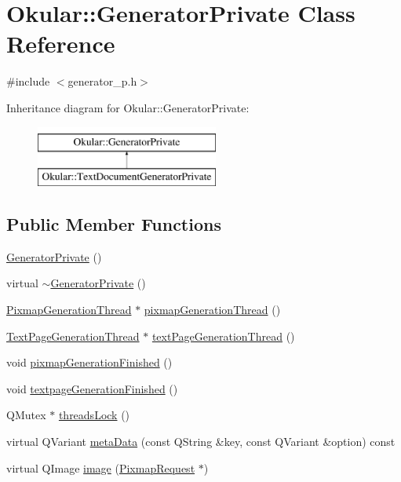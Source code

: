 \hypertarget{classOkular_1_1GeneratorPrivate}{\section{Okular\+:\+:Generator\+Private Class Reference}
\label{classOkular_1_1GeneratorPrivate}
}


{\ttfamily \#include $<$generator\+\_\+p.\+h$>$}

Inheritance diagram for Okular\+:\+:Generator\+Private\+:\begin{figure}[H]
\begin{center}
\leavevmode
\includegraphics[height=2.000000cm]{classOkular_1_1GeneratorPrivate}
\end{center}
\end{figure}
\subsection*{Public Member Functions}
\begin{DoxyCompactItemize}
\item 
\hyperlink{classOkular_1_1GeneratorPrivate_a55956337bf6623f62518a43f4dfaf2dd}{Generator\+Private} ()
\item 
virtual \hyperlink{classOkular_1_1GeneratorPrivate_a8fb21ab9da621b7a680517271124583a}{$\sim$\+Generator\+Private} ()
\item 
\hyperlink{classOkular_1_1PixmapGenerationThread}{Pixmap\+Generation\+Thread} $\ast$ \hyperlink{classOkular_1_1GeneratorPrivate_afbbf7c15c7afb7ba64a5f8ba6d34133c}{pixmap\+Generation\+Thread} ()
\item 
\hyperlink{classOkular_1_1TextPageGenerationThread}{Text\+Page\+Generation\+Thread} $\ast$ \hyperlink{classOkular_1_1GeneratorPrivate_aa48785e9580ec80475ab0638f7c1ffd3}{text\+Page\+Generation\+Thread} ()
\item 
void \hyperlink{classOkular_1_1GeneratorPrivate_a126eed1c8520662806c90e87b30efdd9}{pixmap\+Generation\+Finished} ()
\item 
void \hyperlink{classOkular_1_1GeneratorPrivate_a8e8bc737de0e824dcbd63bddf6d2a71b}{textpage\+Generation\+Finished} ()
\item 
Q\+Mutex $\ast$ \hyperlink{classOkular_1_1GeneratorPrivate_a2f205895b0b86d4bd61143b53e9a255a}{threads\+Lock} ()
\item 
virtual Q\+Variant \hyperlink{classOkular_1_1GeneratorPrivate_af48e4b188bbc9799d08cd36b2b66f6e7}{meta\+Data} (const Q\+String \&key, const Q\+Variant \&option) const 
\item 
virtual Q\+Image \hyperlink{classOkular_1_1GeneratorPrivate_ad97873993be234a51c08efdb06d2f38b}{image} (\hyperlink{classOkular_1_1PixmapRequest}{Pixmap\+Request} $\ast$)
\end{DoxyCompactItemize}

